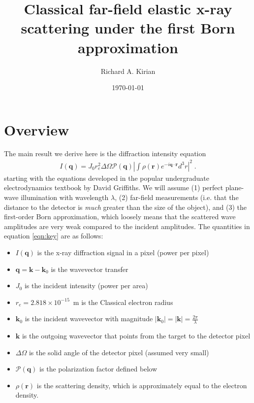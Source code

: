 \documentclass[12pt]{article}
\title{Classical far-field elastic x-ray scattering under the first Born approximation}
\author{Richard A. Kirian}
\date{\today}
\renewcommand{\vec}[1]{\boldsymbol{#1}}
\newcommand{\abs}[1]{\left| #1 \right|}
\begin{document}
\maketitle

\section{Overview}
 
The main result we derive here is the diffraction intensity equation
\begin{align}\label{eqn:key}
    I(\vec{q}) = J_0 r_e^2 \Delta \Omega \mathcal{P}(\vec{q})  \abs{\int
\rho(\vec{r}) e^{-i \vec{q}\cdot\vec{r}} d^3 r }^2 \;.
\end{align}
starting with the equations developed in the popular undergraduate 
electrodynamics textbook by David Griffiths\cite{Griffiths2018}.
We will assume (1) perfect plane-wave illumination with wavelength 
$\lambda$, (2) far-field measurements (i.e. that the distance to the detector is
\emph{much} greater than the size of the object), and (3) the first-order Born 
approximation, which loosely means that the scattered wave amplitudes are very 
weak compared to the incident amplitudes. The quantities in equation 
\ref{eqn:key} are as follows:
\begin{itemize}
\item $I(\vec{q})$ is the x-ray diffraction signal in a pixel (power per 
pixel)
\item $\vec{q}=\vec{k}-\vec{k}_0$ is the wavevector transfer
\item $J_0$ is the incident intensity (power per area)
\item $r_e = 2.818 \times 10^{-15}$~m is the Classical electron radius
\item $\vec{k}_0$ is the incident wavevector with magnitude $|\vec{k}_0| = 
|\vec{k}| = \frac{2\pi}{\lambda}$
\item $\vec{k}$ is the outgoing wavevector that points from the target to the detector pixel
\item $\Delta \Omega$ is the solid angle of the detector pixel (assumed very 
small)
\item $\mathcal{P}(\vec{q})$ is the polarization factor defined below
\item $\rho(\vec{r})$ is the scattering density, which is approximately equal to 
the electron density.
\end{itemize}
\end{document}
